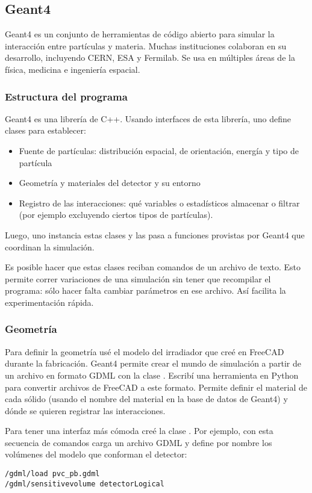 \subsection{Geant4}
Geant4 es un conjunto de herramientas de código abierto
para simular la interacción entre partículas y materia.
Muchas instituciones colaboran en su desarrollo,
incluyendo CERN, ESA y Fermilab.
Se usa en múltiples áreas de la física, medicina e ingeniería espacial.
\subsubsection{Estructura del programa}
Geant4 es una librería de C++.
Usando interfaces de esta librería,
uno define clases para establecer:
\begin{itemize}
    \item Fuente de partículas: distribución espacial, de orientación, energía
        y tipo de partícula
    \item Geometría y materiales del detector y su entorno
    \item Registro de las interacciones: qué variables o estadísticos
        almacenar o filtrar (por ejemplo excluyendo ciertos tipos de
        partículas).
\end{itemize}
Luego, uno instancia estas clases y las pasa a funciones provistas por Geant4
que coordinan la simulación.

Es posible hacer que estas clases reciban comandos de un archivo de texto.
Esto permite correr variaciones de una simulación sin tener que recompilar el
programa: sólo hacer falta cambiar parámetros en ese archivo.
Así facilita la experimentación rápida.
\subsubsection{Geometría}
Para definir la geometría usé el modelo del irradiador que creé en FreeCAD
durante la fabricación.
Geant4 permite crear el mundo de simulación a partir de un archivo
en formato GDML\cite{chytracek_geometry_2006}
con la clase .
Escribí una herramienta en Python para convertir archivos 
 de FreeCAD
a este formato.
Permite definir el material de cada sólido
(usando el nombre del material en la base de datos de Geant4)
y dónde se quieren registrar las interacciones.

Para tener una interfaz más cómoda creé la clase
. 
Por ejemplo, con esta secuencia de comandos carga un archivo GDML y define
por nombre los volúmenes del modelo que conforman el detector:
\begin{verbatim}
/gdml/load pvc_pb.gdml
/gdml/sensitivevolume detectorLogical
\end{verbatim}

